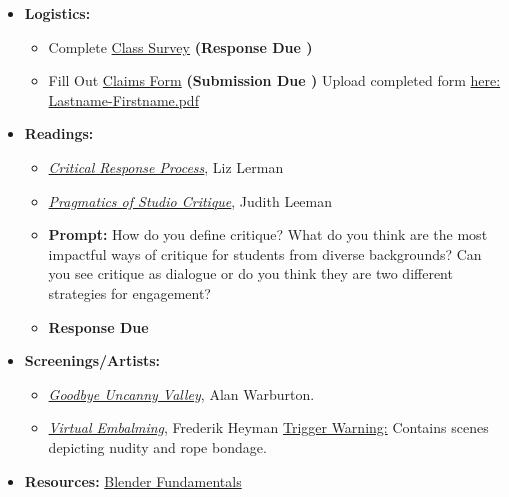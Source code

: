 \begin{itemize}[noitemsep,topsep=0pt,leftmargin=*]
      \item \textbf{Logistics:}
                  \begin{itemize}
                        \item Complete \href{https://forms.gle/t2oFW9zMPq9WHAhT7}{Class Survey} \textbf{(Response Due \dFri)}
                        \item Fill Out \href{https://drive.google.com/file/d/1lfmTV3G5hzwf4YUvxlSUWwahs2fQIglq/view}{Claims Form} \textbf{(Submission Due \dFri)}
                              \newline Upload completed form \href{https://osu.app.box.com/f/572052d11c8a4e3ab7d1320328d028a0}{here: Lastname-Firstname.pdf}
                  \end{itemize}
            \item \textbf{Readings:}
                  \begin{itemize}
                        \item \emph{\href{https://drive.google.com/file/d/1tnvKJBaXn2kFXjp-KB8p0_dkKuw1R4fu/view?usp=sharing}{Critical Response Process}}, Liz Lerman
                        \item \emph{\href{https://drive.google.com/file/d/1vUej0gK5nckVl6hvf68lcHJrh1w73h12/view?usp=sharing}{Pragmatics of Studio Critique}}, Judith Leeman
                        \item \textbf{Prompt:} How do you define critique? What do you think are the most impactful ways of critique for students from diverse backgrounds? Can you see critique as dialogue or do you think they are two different strategies for engagement?
                        \item \textbf{Response Due \dThur}
                  \end{itemize}
            \item \textbf{Screenings/Artists:}
            \begin{itemize}
                  \item \href{https://alanwarburton.co.uk/goodbye-uncanny-valley}{\emph{Goodbye Uncanny Valley}}, Alan Warburton.
                  \item \href{https://www.nowness.com/story/virtual-embalming-frederik-heyman}{\emph{Virtual Embalming}}, Frederik Heyman \newline
                  \small{\ul{Trigger Warning:} Contains scenes depicting nudity and rope bondage.}
            \end{itemize} 
            \item \textbf{Resources:} \href{https://cloud.blender.org/p/blender-fundamentals/}{Blender Fundamentals}
\end{itemize}